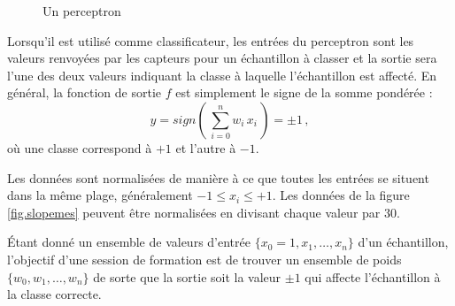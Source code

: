 \begin{figure}
\begin{center}
\end{center}
\caption{Un perceptron}\label{fig.perceptron}
\end{figure}

Lorsqu'il est utilisé comme classificateur, les entrées du perceptron sont les valeurs renvoyées par les capteurs pour un échantillon à classer et la sortie sera l'une des deux valeurs indiquant la classe à laquelle l'échantillon est affecté. En général, la fonction de sortie $f$ est simplement le signe de la somme pondérée :
\begin{equation}
y=sign\left(\,\sum_{i=0}^{n} w_i\,x_i\,\right)=\pm 1\,,\label{eq.perceptron-output}
\end{equation}
où une classe correspond à $+1$ et l'autre à $-1$.

Les données sont normalisées de manière à ce que toutes les entrées se situent dans la même plage, généralement $-1\leq x_i\leq +1$. Les données de la figure \ref{fig.slopemes} peuvent être normalisées en divisant chaque valeur par $30$.

Étant donné un ensemble de valeurs d'entrée $\{x_0=1,x_1,\ldots,x_n\}$ d'un échantillon, l'objectif d'une session de formation est de trouver un ensemble de poids $\{w_0,w_1,\ldots,w_n\}$ de sorte que la sortie soit la valeur $\pm 1$ qui affecte l'échantillon à la classe correcte.

